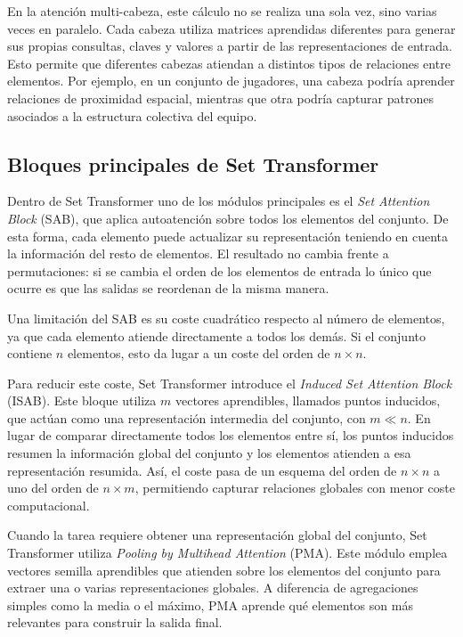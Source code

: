 En la atención multi-cabeza, este cálculo no se realiza una sola vez, sino varias veces en paralelo. Cada cabeza utiliza matrices aprendidas diferentes para generar sus propias consultas, claves y valores a partir de las representaciones de entrada. Esto permite que diferentes cabezas atiendan a distintos tipos de relaciones entre elementos. Por ejemplo, en un conjunto de jugadores, una cabeza podría aprender relaciones de proximidad espacial, mientras que otra podría capturar patrones asociados a la estructura colectiva del equipo.

\subsection{Bloques principales de Set Transformer}

Dentro de Set Transformer uno de los módulos principales es el \textit{Set Attention Block} (SAB), que aplica autoatención sobre todos los elementos del conjunto. De esta forma, cada elemento puede actualizar su representación teniendo en cuenta la información del resto de elementos. El resultado no cambia frente a permutaciones: si se cambia el orden de los elementos de entrada lo único que ocurre es que las salidas se reordenan de la misma manera.

Una limitación del SAB es su coste cuadrático respecto al número de elementos, ya que cada elemento atiende directamente a todos los demás. Si el conjunto contiene $n$ elementos, esto da lugar a un coste del orden de $n \times n$.

Para reducir este coste, Set Transformer introduce el \textit{Induced Set Attention Block} (ISAB). Este bloque utiliza $m$ vectores aprendibles, llamados puntos inducidos, que actúan como una representación intermedia del conjunto, con $m \ll n$. En lugar de comparar directamente todos los elementos entre sí, los puntos inducidos resumen la información global del conjunto y los elementos atienden a esa representación resumida. Así, el coste pasa de un esquema del orden de $n \times n$ a uno del orden de $n \times m$, permitiendo capturar relaciones globales con menor coste computacional.

Cuando la tarea requiere obtener una representación global del conjunto, Set Transformer utiliza \textit{Pooling by Multihead Attention} (PMA). Este módulo emplea vectores semilla aprendibles que atienden sobre los elementos del conjunto para extraer una o varias representaciones globales. A diferencia de agregaciones simples como la media o el máximo, PMA aprende qué elementos son más relevantes para construir la salida final.

